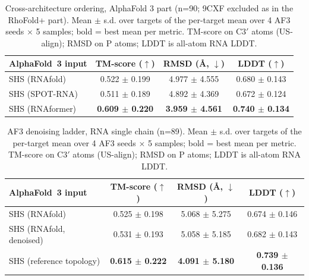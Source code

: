 \begin{table}[htbp]
\centering
\caption{Cross-architecture ordering, AlphaFold 3 part (n=90; 9CXF excluded as in the RhoFold+ part). Mean $\pm$ s.d. over targets of the per-target mean over 4 AF3 seeds $\times$ 5 samples; bold = best mean per metric. TM-score on C3$'$ atoms (US-align); RMSD on P atoms; LDDT is all-atom RNA LDDT.}
\label{tab:order_rna_single_chain_af3}
\begin{tabular}{lccc}
\toprule
AlphaFold~3 input & TM-score ($\uparrow$) & RMSD (\AA, $\downarrow$) & LDDT ($\uparrow$) \\
\midrule
SHS (RNAfold) & 0.522 $\pm$ 0.199 & 4.977 $\pm$ 4.555 & 0.680 $\pm$ 0.143 \\
SHS (SPOT-RNA) & 0.511 $\pm$ 0.189 & 4.892 $\pm$ 4.369 & 0.672 $\pm$ 0.124 \\
SHS (RNAformer) & \textbf{0.609 $\pm$ 0.220} & \textbf{3.959 $\pm$ 4.561} & \textbf{0.740 $\pm$ 0.134} \\
\bottomrule
\end{tabular}
\end{table}

\begin{table}[htbp]
\centering
\caption{AF3 denoising ladder, RNA single chain (n=89). Mean $\pm$ s.d. over targets of the per-target mean over 4 AF3 seeds $\times$ 5 samples; bold = best mean per metric. TM-score on C3$'$ atoms (US-align); RMSD on P atoms; LDDT is all-atom RNA LDDT.}
\label{tab:denoise_main}
\begin{tabular}{lccc}
\toprule
AlphaFold~3 input & TM-score ($\uparrow$) & RMSD (\AA, $\downarrow$) & LDDT ($\uparrow$) \\
\midrule
SHS (RNAfold) & 0.525 $\pm$ 0.198 & 5.068 $\pm$ 5.275 & 0.674 $\pm$ 0.146 \\
SHS (RNAfold, denoised) & 0.531 $\pm$ 0.193 & 5.058 $\pm$ 5.185 & 0.682 $\pm$ 0.143 \\
SHS (reference topology) & \textbf{0.615 $\pm$ 0.222} & \textbf{4.091 $\pm$ 5.180} & \textbf{0.739 $\pm$ 0.136} \\
\bottomrule
\end{tabular}
\end{table}

